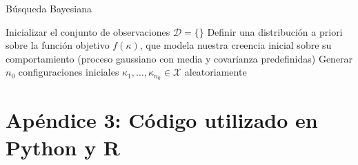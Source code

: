 \documentclass[11pt]{book}
\theoremstyle{plain} %
\theoremstyle{definition} %
\begin{document}
\begin{algorithm}[H]
\caption{Búsqueda Bayesiana}
Inicializar el conjunto de observaciones $\mathcal{D} = \{\}$\;
Definir una distribución a priori sobre la función objetivo $f(\kappa)$, 
que modela nuestra creencia inicial sobre su comportamiento 
(proceso gaussiano con media y covarianza predefinidas)\;
Generar $n_0$ configuraciones iniciales $\kappa_1, \dots, \kappa_{n_0} \in \mathcal{X}$ aleatoriamente\;


\end{algorithm}
\setcounter{chapter}{3}
\setcounter{section}{0}

\chapter{Apéndice 3: Código utilizado en Python y R}
\end{document}
